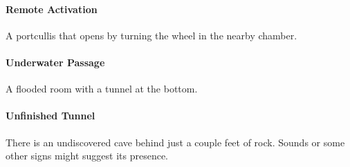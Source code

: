 \documentclass[itdr]{subfiles}
\begin{document}
\vfill
\paragraph{Remote Activation}
A portcullis that opens by turning the wheel in the nearby chamber.

\vfill
\paragraph{Underwater Passage}
A flooded room with a tunnel at the bottom.

\vfill
\paragraph{Unfinished Tunnel}
There is an undiscovered cave behind just a couple feet of rock. Sounds or some other signs might suggest its presence.

\vfill
\end{document}
